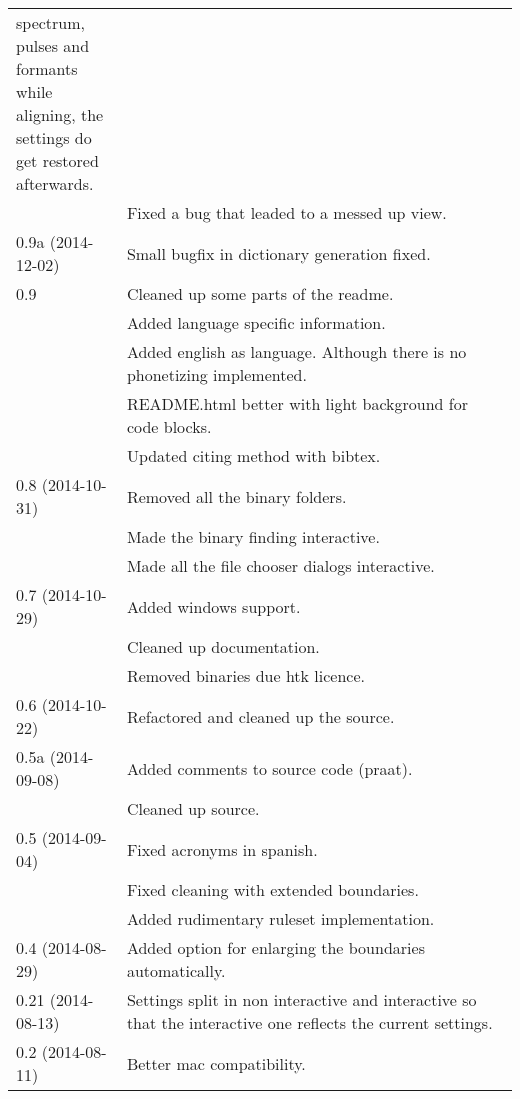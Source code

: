 \begin{longtable}{|p{0.22\linewidth}p{0.8\linewidth}|}
spectrum, pulses and formants while aligning, the settings do get restored
afterwards.\\
		& \tabitem{} Fixed a bug that leaded to a messed up view.\\
	\midrule
	0.9a (2014{-}12{-}02) & \tabitem{} Small bugfix in dictionary generation fixed.\\
	\midrule
	0.9 & \tabitem{} Cleaned up some parts of the readme.\\
		& \tabitem{} Added language specific information.\\
		& \tabitem{} Added english as language. Although there is no phonetizing
implemented.\\
		& \tabitem{} README.html better with light background for code blocks.\\
		& \tabitem{} Updated citing method with bibtex.\\
	\midrule
	0.8 (2014{-}10{-}31) & \tabitem{} Removed all the binary folders.\\
		& \tabitem{} Made the binary finding interactive.\\
		& \tabitem{} Made all the file chooser dialogs interactive.\\
	\midrule
	0.7 (2014{-}10{-}29) & \tabitem{} Added windows support.\\
		&	\tabitem{} Cleaned up documentation.\\
		& \tabitem{} Removed binaries due htk licence.\\
	\midrule
	0.6 (2014{-}10{-}22) & \tabitem{} Refactored and cleaned up the source.\\
	\midrule
	0.5a (2014{-}09{-}08) & \tabitem{} Added comments to source code (praat).\\
		& \tabitem{} Cleaned up source.\\
	\midrule
	0.5 (2014{-}09{-}04) & \tabitem{} Fixed acronyms in spanish.\\
		& \tabitem{} Fixed cleaning with extended boundaries.\\
		& \tabitem{} Added rudimentary ruleset implementation.\\
	\midrule
	0.4 (2014{-}08{-}29) & \tabitem{} Added option for enlarging the boundaries
automatically.\\
	\midrule
	0.21 (2014{-}08{-}13) & \tabitem{} Settings split in non interactive and
interactive so that the interactive one reflects the current settings.\\
	\midrule
	0.2 (2014{-}08{-}11) & \tabitem{} Better mac compatibility.\\
	\midrule

\end{longtable}
